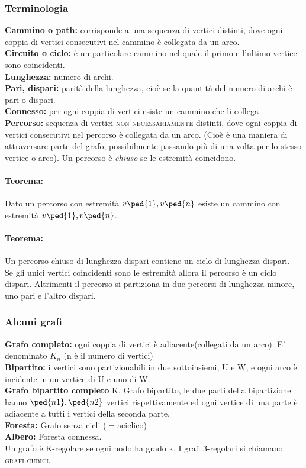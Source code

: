 \subsubsection{Terminologia}

\textbf{Cammino o path:} corrisponde a una sequenza di vertici distinti, dove ogni coppia di vertici consecutivi nel cammino è collegata da un arco. \\
\textbf{Circuito o ciclo:} è un particolare cammino nel quale il primo e l'ultimo vertice sono coincidenti. \\
\textbf{Lunghezza:} numero di archi.\\
\textbf{Pari, dispari:} parità della lunghezza, cioè se la quantità del numero di archi è pari o dispari. \\
\textbf{Connesso:} per ogni coppia di vertici esiste un
cammino che li collega \\
\textbf{Percorso:} sequenza di vertici \textsc{non necessariamente} distinti, dove ogni coppia di vertici
consecutivi nel percorso è collegata da un arco. (Cioè è una maniera di attraversare parte del
grafo, possibilmente passando più di una volta per lo stesso vertice o arco). Un percorso è \emph{chiuso}
se le estremità coincidono.

\paragraph{Teorema:} Dato un percorso con estremità \( v\ped{1}, v\ped{n} \) esiste un cammino con estremità \( v\ped{1}, v\ped{n} \).
\paragraph{Teorema:} Un percorso chiuso di lunghezza dispari contiene un ciclo di lunghezza dispari. \\
Se gli unici vertici coincidenti sono le estremità allora il percorso è un ciclo dispari. Altrimenti il percorso si partiziona in due percorsi di lunghezza minore, uno pari e l'altro dispari.

\subsubsection{Alcuni grafi} 
\textbf{Grafo completo:} ogni coppia di vertici è adiacente(collegati da un arco). E' denominato $K_n$ (n è il numero di vertici) \\
\textbf{Bipartito:} i vertici sono partizionabili in due sottoinsiemi, U e W, e ogni arco è incidente in un vertice di U e uno di W. \\
\textbf{Grafo bipartito completo} K, Grafo bipartito, le due parti della bipartizione hanno \( \ped{n1}, \ped{n2} \) vertici rispettivamente ed ogni vertice di una parte è adiacente a tutti i vertici della seconda parte. \\
\textbf{Foresta:} Grafo senza cicli ($=$aciclico) \\
\textbf{Albero:} Foresta connessa. \\
Un grafo è K-regolare se ogni nodo ha grado k. I grafi 3-regolari si chiamano \textsc{grafi cubici}. \\

